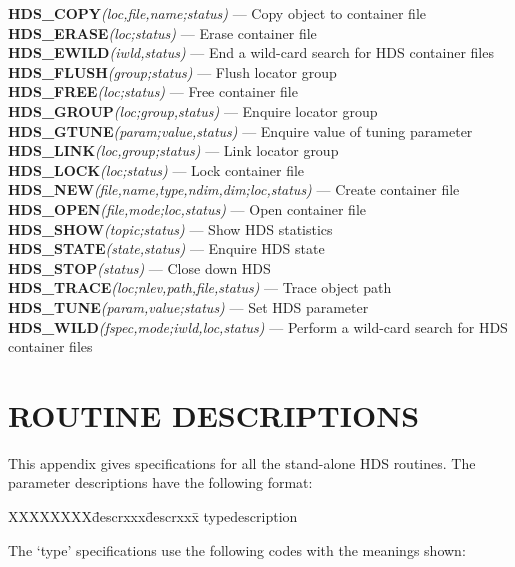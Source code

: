 {\bf HDS\_COPY}{\em (loc,file,name;status)} --- Copy object to container file \\
{\bf HDS\_ERASE}{\em (loc;status)} --- Erase container file \\
{\bf HDS\_EWILD}{\em (iwld,status)} --- End a wild-card search for HDS container
files \\
{\bf HDS\_FLUSH}{\em (group;status)} --- Flush locator group \\
{\bf HDS\_FREE}{\em (loc;status)} --- Free container file \\
{\bf HDS\_GROUP}{\em (loc;group,status)} --- Enquire locator group \\
{\bf HDS\_GTUNE}{\em (param;value,status)} --- Enquire value of tuning parameter \\
{\bf HDS\_LINK}{\em (loc,group;status)} --- Link locator group \\
{\bf HDS\_LOCK}{\em (loc;status)} --- Lock container file \\
{\bf HDS\_NEW}{\em (file,name,type,ndim,dim;loc,status)} --- Create container file \\
{\bf HDS\_OPEN}{\em (file,mode;loc,status)} --- Open container file \\
{\bf HDS\_SHOW}{\em (topic;status)} --- Show HDS statistics \\
{\bf HDS\_STATE}{\em (state,status)} --- Enquire HDS state \\
{\bf HDS\_STOP}{\em (status)} --- Close down HDS \\
{\bf HDS\_TRACE}{\em (loc;nlev,path,file,status)} --- Trace object path \\
{\bf HDS\_TUNE}{\em (param,value;status)} --- Set HDS parameter \\
{\bf HDS\_WILD}{\em (fspec,mode;iwld,loc,status)} --- Perform a wild-card search
for HDS container files
\normalsize

\newpage
\section{ROUTINE DESCRIPTIONS}
\label{appendix:routines}

This appendix gives specifications for all the stand-alone HDS routines. The
parameter descriptions have the following format:

\begin{tabbing}
XXXXXXXX\=descrxxx\=descrxxx\=\kill
{}\>type\>description
\end{tabbing}

The `type' specifications use the following codes with the meanings shown:

